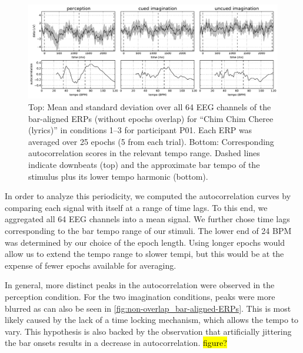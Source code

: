 \begin{figure}[t]
  \begin{center}
    \includegraphics[width=\textwidth,keepaspectratio=true]{Figures/non-overlap_bar-aligned-ERPs.pdf}
    \caption{%
Top: Mean and standard deviation over all 64 EEG channels of the bar-aligned ERPs
(without epochs overlap)
for ``Chim Chim Cheree (lyrics)'' in conditions 1--3 for participant P01.
Each ERP was averaged over 25 epochs (5 from each trial).
Bottom: Corresponding autocorrelation scores in the relevant tempo range.
Dashed lines indicate downbeats (top) and the approximate bar tempo of the stimulus plus its lower tempo harmonic (bottom).
}
    \label{fig:non-overlap_bar-aligned-ERPs}
  \end{center}
\end{figure}

In order to analyze this periodicity, we computed the autocorrelation curves by comparing each signal with itself at a range of time lags.
To this end, we aggregated all 64 EEG channels into a mean signal.
We further chose time lags corresponding to the bar tempo range of our stimuli.
The lower end of 24 BPM was determined by our choice of the epoch length. 
Using longer epochs would allow us to extend the tempo range to slower tempi, but this would be at the expense of fewer epochs available for averaging.

In general, more distinct peaks in the autocorrelation were observed in the perception condition.
For the two imagination conditions, peaks were more blurred as can also be seen in \autoref{fig:non-overlap_bar-aligned-ERPs}.
This is most likely caused by the lack of a time locking mechanism, which allows the tempo to vary.
This hypothesis is also backed by the observation that artificially jittering the bar onsets results in a decrease in autocorrelation. \hl{figure?}

